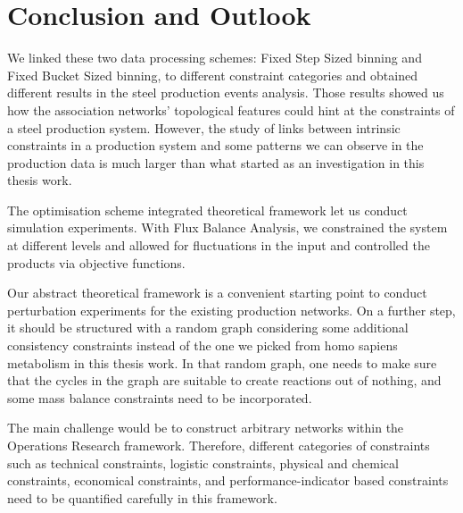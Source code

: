 \chapter{Conclusion and Outlook}

We linked these two data processing schemes: Fixed Step Sized binning and Fixed Bucket Sized binning, to different constraint categories and obtained different results in the steel production events analysis. Those results showed us how the association networks' topological features could hint at the constraints of a steel production system. However, the study of links between intrinsic constraints in a production system and some patterns we can observe in the production data is much larger than what started as an investigation in this thesis work.

The optimisation scheme integrated theoretical framework let us conduct simulation experiments. With Flux Balance Analysis, we constrained the system at different levels and allowed for fluctuations in the input and controlled the products via objective functions. 

Our abstract theoretical framework is a convenient starting point to conduct perturbation experiments for the existing production networks. On a further step, it should be structured with a random graph considering some additional consistency constraints instead of the one we picked from homo sapiens metabolism in this thesis work. In that random graph, one needs to make sure that the cycles in the graph are suitable to create reactions out of nothing, and some mass balance constraints need to be incorporated. 

The main challenge would be to construct arbitrary networks within the Operations Research framework. Therefore, different categories of constraints such as technical constraints, logistic constraints, physical and chemical constraints, economical constraints, and performance-indicator based constraints need to be quantified carefully in this framework.

